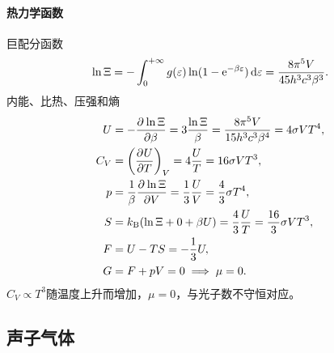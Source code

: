 \paragraph{热力学函数}

巨配分函数
\begin{equation}
	\ln\Xi=-\int\zti g(\varepsilon)\ln(1-\e{-\beta\varepsilon})\d\varepsilon=\frac{8\pi^5V}{45h^3c^3\beta^3}.
\end{equation}
内能、比热、压强和熵
\begin{subequations}
	\begin{align}
		U&=-\pv{\ln\Xi}\beta=3\frac{\ln\Xi}\beta=\frac{8\pi^5V}{15h^3c^3\beta^4}=4\sigma VT^4,\\
		C_V&=\pu[V]UT=4\frac UT=16\sigma VT^3,\\
		p&=\frac1\beta\pv{\ln\Xi}V=\frac13\frac UV=\frac43\sigma T^4,\\
		S&=\kB(\ln\Xi+0+\beta U)=\frac43\frac UT=\frac{16}3\sigma VT^3,\\
		F&=U-TS=-\frac13U,\\
		G&=F+pV=0\implies\mu=0.
	\end{align}
\end{subequations}
$C_V\propto T^3$随温度上升而增加，$\mu=0$，与光子数不守恒对应。

\subsection{声子气体}

